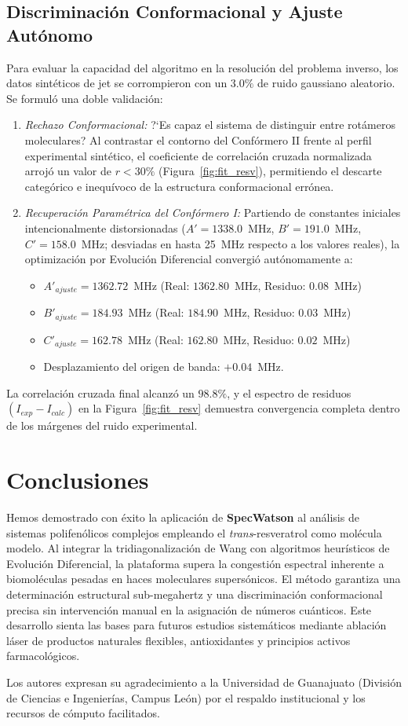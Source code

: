 \documentclass[aps,jcp,reprint,twocolumn,superscriptaddress,showpacs,amsmath,amssymb]{revtex4-2}
\begin{document}
\subsection{Discriminaci\'on Conformacional y Ajuste Aut\'onomo}
Para evaluar la capacidad del algoritmo en la resoluci\'on del problema inverso, los datos sint\'eticos de jet se corrompieron con un $3.0\%$ de ruido gaussiano aleatorio. Se formul\'o una doble validaci\'on:
\begin{enumerate}
    \item \textit{Rechazo Conformacional:} ?`Es capaz el sistema de distinguir entre rot\'ameros moleculares? Al contrastar el contorno del Conf\'ormero II frente al perfil experimental sint\'etico, el coeficiente de correlaci\'on cruzada normalizada arroj\'o un valor de $r < 30\%$ (Figura~\ref{fig:fit_resv}), permitiendo el descarte categ\'orico e inequ\'ivoco de la estructura conformacional err\'onea.
    \item \textit{Recuperaci\'on Param\'etrica del Conf\'ormero I:} Partiendo de constantes iniciales intencionalmente distorsionadas ($A' = 1338.0$~MHz, $B' = 191.0$~MHz, $C' = 158.0$~MHz; desviadas en hasta 25~MHz respecto a los valores reales), la optimizaci\'on por Evoluci\'on Diferencial convergi\'o aut\'onomamente a:
    \begin{itemize}
        \item $A'_{ajuste} = 1362.72$~MHz (Real: $1362.80$~MHz, Residuo: $0.08$~MHz)
        \item $B'_{ajuste} = 184.93$~MHz (Real: $184.90$~MHz, Residuo: $0.03$~MHz)
        \item $C'_{ajuste} = 162.78$~MHz (Real: $162.80$~MHz, Residuo: $0.02$~MHz)
        \item Desplazamiento del origen de banda: $+0.04$~MHz.
    \end{itemize}
\end{enumerate}

La correlaci\'on cruzada final alcanz\'o un $98.8\%$, y el espectro de residuos $(I_{exp} - I_{calc})$ en la Figura~\ref{fig:fit_resv} demuestra convergencia completa dentro de los m\'argenes del ruido experimental.

\section{Conclusiones}
Hemos demostrado con \'exito la aplicaci\'on de \textbf{SpecWatson} al an\'alisis de sistemas polifen\'olicos complejos empleando el \textit{trans}-resveratrol como mol\'ecula modelo. Al integrar la tridiagonalizaci\'on de Wang con algoritmos heur\'isticos de Evoluci\'on Diferencial, la plataforma supera la congesti\'on espectral inherente a biomol\'eculas pesadas en haces moleculares supers\'onicos. El m\'etodo garantiza una determinaci\'on estructural sub-megahertz y una discriminaci\'on conformacional precisa sin intervenci\'on manual en la asignaci\'on de n\'umeros cu\'anticos. Este desarrollo sienta las bases para futuros estudios sistem\'aticos mediante ablaci\'on l\'aser de productos naturales flexibles, antioxidantes y principios activos farmacol\'ogicos.

\begin{acknowledgments}
Los autores expresan su agradecimiento a la Universidad de Guanajuato (Divisi\'on de Ciencias e Ingenier\'ias, Campus Le\'on) por el respaldo institucional y los recursos de c\'omputo facilitados.
\end{acknowledgments}


\end{document}
